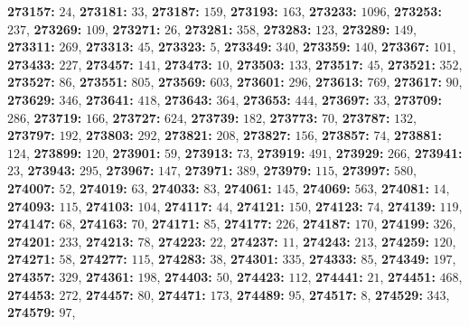 \textsf{\bfseries 273157:} $24$, \textsf{\bfseries 273181:} $33$, \textsf{\bfseries 273187:} $159$, \textsf{\bfseries 273193:} $163$, \textsf{\bfseries 273233:} $1096$, \textsf{\bfseries 273253:} $237$, \textsf{\bfseries 273269:} $109$, \textsf{\bfseries 273271:} $26$, \textsf{\bfseries 273281:} $358$, \textsf{\bfseries 273283:} $123$, \textsf{\bfseries 273289:} $149$, \textsf{\bfseries 273311:} $269$, \textsf{\bfseries 273313:} $45$, \textsf{\bfseries 273323:} $5$, \textsf{\bfseries 273349:} $340$, \textsf{\bfseries 273359:} $140$, \textsf{\bfseries 273367:} $101$, \textsf{\bfseries 273433:} $227$, \textsf{\bfseries 273457:} $141$, \textsf{\bfseries 273473:} $10$, \textsf{\bfseries 273503:} $133$, \textsf{\bfseries 273517:} $45$, \textsf{\bfseries 273521:} $352$, \textsf{\bfseries 273527:} $86$, \textsf{\bfseries 273551:} $805$, \textsf{\bfseries 273569:} $603$, \textsf{\bfseries 273601:} $296$, \textsf{\bfseries 273613:} $769$, \textsf{\bfseries 273617:} $90$, \textsf{\bfseries 273629:} $346$, \textsf{\bfseries 273641:} $418$, \textsf{\bfseries 273643:} $364$, \textsf{\bfseries 273653:} $444$, \textsf{\bfseries 273697:} $33$, \textsf{\bfseries 273709:} $286$, \textsf{\bfseries 273719:} $166$, \textsf{\bfseries 273727:} $624$, \textsf{\bfseries 273739:} $182$, \textsf{\bfseries 273773:} $70$, \textsf{\bfseries 273787:} $132$, \textsf{\bfseries 273797:} $192$, \textsf{\bfseries 273803:} $292$, \textsf{\bfseries 273821:} $208$, \textsf{\bfseries 273827:} $156$, \textsf{\bfseries 273857:} $74$, \textsf{\bfseries 273881:} $124$, \textsf{\bfseries 273899:} $120$, \textsf{\bfseries 273901:} $59$, \textsf{\bfseries 273913:} $73$, \textsf{\bfseries 273919:} $491$, \textsf{\bfseries 273929:} $266$, \textsf{\bfseries 273941:} $23$, \textsf{\bfseries 273943:} $295$, \textsf{\bfseries 273967:} $147$, \textsf{\bfseries 273971:} $389$, \textsf{\bfseries 273979:} $115$, \textsf{\bfseries 273997:} $580$, \textsf{\bfseries 274007:} $52$, \textsf{\bfseries 274019:} $63$, \textsf{\bfseries 274033:} $83$, \textsf{\bfseries 274061:} $145$, \textsf{\bfseries 274069:} $563$, \textsf{\bfseries 274081:} $14$, \textsf{\bfseries 274093:} $115$, \textsf{\bfseries 274103:} $104$, \textsf{\bfseries 274117:} $44$, \textsf{\bfseries 274121:} $150$, \textsf{\bfseries 274123:} $74$, \textsf{\bfseries 274139:} $119$, \textsf{\bfseries 274147:} $68$, \textsf{\bfseries 274163:} $70$, \textsf{\bfseries 274171:} $85$, \textsf{\bfseries 274177:} $226$, \textsf{\bfseries 274187:} $170$, \textsf{\bfseries 274199:} $326$, \textsf{\bfseries 274201:} $233$, \textsf{\bfseries 274213:} $78$, \textsf{\bfseries 274223:} $22$, \textsf{\bfseries 274237:} $11$, \textsf{\bfseries 274243:} $213$, \textsf{\bfseries 274259:} $120$, \textsf{\bfseries 274271:} $58$, \textsf{\bfseries 274277:} $115$, \textsf{\bfseries 274283:} $38$, \textsf{\bfseries 274301:} $335$, \textsf{\bfseries 274333:} $85$, \textsf{\bfseries 274349:} $197$, \textsf{\bfseries 274357:} $329$, \textsf{\bfseries 274361:} $198$, \textsf{\bfseries 274403:} $50$, \textsf{\bfseries 274423:} $112$, \textsf{\bfseries 274441:} $21$, \textsf{\bfseries 274451:} $468$, \textsf{\bfseries 274453:} $272$, \textsf{\bfseries 274457:} $80$, \textsf{\bfseries 274471:} $173$, \textsf{\bfseries 274489:} $95$, \textsf{\bfseries 274517:} $8$, \textsf{\bfseries 274529:} $343$, \textsf{\bfseries 274579:} $97$, 
